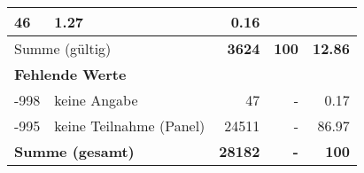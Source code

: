 \begin{longtable}{lXrrr}
       \num{46} &
       \num[round-mode=places,round-precision=2]{1.27} &
         \num[round-mode=places,round-precision=2]{0.16} \\
     \midrule
     \multicolumn{2}{l}{Summe (gültig)} &
       \textbf{\num{3624}} &
     \textbf{\num{100}} &
       \textbf{\num[round-mode=places,round-precision=2]{12.86}} \\
     \multicolumn{5}{l}{\textbf{Fehlende Werte}}\\
       -998 &
       keine Angabe &
         \num{47} &
        - &
         \num[round-mode=places,round-precision=2]{0.17} \\
       -995 &
       keine Teilnahme (Panel) &
         \num{24511} &
        - &
         \num[round-mode=places,round-precision=2]{86.97} \\
     \midrule
     \multicolumn{2}{l}{\textbf{Summe (gesamt)}} &
          \textbf{\num{28182}} &
        \textbf{-} &
        \textbf{\num{100}} \\
     \bottomrule
     \end{longtable}
     
